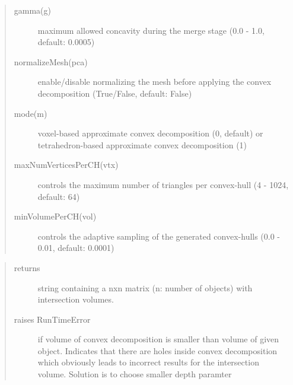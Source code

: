\documentclass[letterpaper,10pt,english]{sphinxmanual}
\begin{document}
\begin{description}
\begin{quote}
\begin{description}
\item[{gamma(g)}] \leavevmode
maximum allowed concavity during the merge stage (0.0 - 1.0, default: 0.0005)

\item[{normalizeMesh(pca)}] \leavevmode
enable/disable normalizing the mesh before applying the convex decomposition (True/False, default: False)

\item[{mode(m)}] \leavevmode
voxel-based approximate convex decomposition (0, default) or tetrahedron-based approximate convex decomposition (1)

\item[{maxNumVerticesPerCH(vtx)}] \leavevmode
controls the maximum number of triangles per convex-hull (4 - 1024, default: 64)

\item[{minVolumePerCH(vol)}] \leavevmode
controls the adaptive sampling of the generated convex-hulls (0.0 - 0.01, default: 0.0001)

\end{description}\end{quote}

\end{description}
\begin{quote}\begin{description}
\item[{returns}] \leavevmode
string containing a nxn matrix (n: number of objects) with intersection volumes.

\item[{raises RunTimeError}] \leavevmode
if volume of convex decomposition is smaller than volume of given object. Indicates that there are holes inside convex decomposition which obviously leads to incorrect results for the intersection volume. Solution is to choose smaller depth paramter

\end{description}\end{quote}
\end{document}
